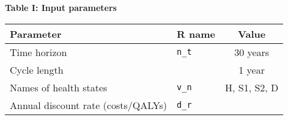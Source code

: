 \documentclass[]{article}
\begin{document}
\textbf{Table I: Input parameters}

\begin{longtable}[]{@{}llc@{}}
\toprule
\begin{minipage}[b]{0.47\columnwidth}\raggedright\strut
\textbf{Parameter}\strut
\end{minipage} & \begin{minipage}[b]{0.18\columnwidth}\raggedright\strut
\textbf{R name}\strut
\end{minipage} & \begin{minipage}[b]{0.20\columnwidth}\centering\strut
\textbf{Value}\strut
\end{minipage}\tabularnewline
\midrule
\endhead
\begin{minipage}[t]{0.47\columnwidth}\raggedright\strut
Time horizon\strut
\end{minipage} & \begin{minipage}[t]{0.18\columnwidth}\raggedright\strut
\texttt{n\_t}\strut
\end{minipage} & \begin{minipage}[t]{0.20\columnwidth}\centering\strut
30 years\strut
\end{minipage}\tabularnewline
\begin{minipage}[t]{0.47\columnwidth}\raggedright\strut
Cycle length\strut
\end{minipage} & \begin{minipage}[t]{0.18\columnwidth}\raggedright\strut
\strut
\end{minipage} & \begin{minipage}[t]{0.20\columnwidth}\centering\strut
1 year\strut
\end{minipage}\tabularnewline
\begin{minipage}[t]{0.47\columnwidth}\raggedright\strut
Names of health states\strut
\end{minipage} & \begin{minipage}[t]{0.18\columnwidth}\raggedright\strut
\texttt{v\_n}\strut
\end{minipage} & \begin{minipage}[t]{0.20\columnwidth}\centering\strut
H, S1, S2, D\strut
\end{minipage}\tabularnewline
\begin{minipage}[t]{0.47\columnwidth}\raggedright\strut
Annual discount rate (costs/QALYs)\strut
\end{minipage} & \begin{minipage}[t]{0.18\columnwidth}\raggedright\strut
\texttt{d\_r}\strut
\end{minipage} & \begin{minipage}[t]{0.20\columnwidth}\centering\strut

\end{minipage}
\end{longtable}
\end{document}
